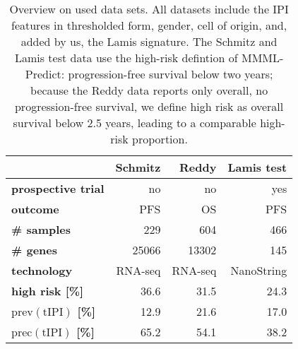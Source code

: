 \begin{table}
    \centering
    \begin{tabular}{lrrr}
        \hline
        & \textbf{Schmitz \cite{schmitz18}} & \textbf{Reddy \cite{reddy17}} & \textbf{Lamis test \cite{staiger20}} \\
        \hline
        \textbf{prospective trial} & no & no & yes \\
        \textbf{outcome} & PFS & OS & PFS \\
        \textbf{\# samples} & \num{229} & \num{604} & \num{466} \\
        \textbf{\# genes} & \num{25066} & \num{13302} & \num{145} \\
        \textbf{technology} & RNA-seq & RNA-seq & NanoString \\
        \textbf{high risk [\%]} & \num{36.6} & \num{31.5}\footnotemark & \num{24.3} \\
        \textbf{$\text{prev}(\text{tIPI})$ [\%]} & \num{12.9} & \num{21.6} & \num{17.0} \\
        \textbf{$\text{prec}(\text{tIPI})$ [\%]} & \num{65.2} & \num{54.1} & \num{38.2} \\
        \hline
    \end{tabular}
    \caption{Overview on used data sets. All datasets include the IPI features in thresholded form, 
        gender, cell of origin, and, added by us, the Lamis signature. The Schmitz and Lamis test 
        data use the high-risk defintion of MMML-Predict: progression-free survival below two years; 
        because the Reddy data reports only overall, no progression-free survival, we define high risk 
        as overall survival below \num{2.5} years, leading to a comparable high-risk proportion.}
        \label{table:data}
\end{table}